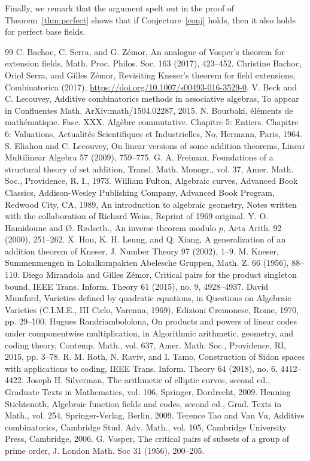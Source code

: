 \documentclass[10pt]{amsart}
\theoremstyle{definition}
\theoremstyle{remark}
\begin{document}
Finally, we remark that the argument spelt out in the proof of Theorem~\ref{thm:perfect} shows that if Conjecture~\ref{conj} holds, then it also holds for perfect base fields.
\begin{thebibliography}{99}
 C. Bachoc, C. Serra, and G. Zémor, An analogue of Vosper's theorem for extension fields, Math. Proc. Philos. Soc. 163 (2017), 423--452.
 Christine Bachoc, Oriol Serra, and Gilles Zémor, Revisiting Kneser's theorem for field extensions, Combinatorica (2017), \url{https://doi.org/10.1007/s00493-016-3529-0}.
 V. Beck and C. Lecouvey, Additive combinatorics methods in associative algebras, To appear in Confluentes Math. ArXiv:math/1504.02287, 2015.
 N. Bourbaki, éléments de mathématique. Fasc. XXX. Algèbre commutative. Chapitre 5: Entiers. Chapitre 6: Valuations, Actualités Scientifiques et Industrielles, No, Hermann, Paris, 1964.
 S. Eliahou and C. Lecouvey, On linear versions of some addition theorems, Linear Multilinear Algebra 57 (2009), 759--775.
 G. A. Freiman, Foundations of a structural theory of set addition, Transl. Math. Monogr., vol. 37, Amer. Math. Soc., Providence, R. I., 1973.
 William Fulton, Algebraic curves, Advanced Book Classics, Addison-Wesley Publishing Company, Advanced Book Program, Redwood City, CA, 1989, An introduction to algebraic geometry, Notes written with the collaboration of Richard Weiss, Reprint of 1969 original.
 Y. O. Hamidoune and Ø. Rødseth., An inverse theorem modulo $p$, Acta Arith. 92 (2000), 251--262.
 X. Hou, K. H. Leung, and Q. Xiang, A generalization of an addition theorem of Kneser, J. Number Theory 97 (2002), 1--9.
 M. Kneser, Summenmengen in Lokalkompakten Abelesche Gruppen, Math. Z. 66 (1956), 88--110.
 Diego Mirandola and Gilles Zémor, Critical pairs for the product singleton bound, IEEE Trans. Inform. Theory 61 (2015), no. 9, 4928--4937.
 David Mumford, Varieties defined by quadratic equations, in Questions on Algebraic Varieties (C.I.M.E., III Ciclo, Varenna, 1969), Edizioni Cremonese, Rome, 1970, pp. 29--100.
 Hugues Randriambololona, On products and powers of linear codes under componentwise multiplication, in Algorithmic arithmetic, geometry, and coding theory, Contemp. Math., vol. 637, Amer. Math. Soc., Providence, RI, 2015, pp. 3--78.
 R. M. Roth, N. Raviv, and I. Tamo, Construction of Sidon spaces with applications to coding, IEEE Trans. Inform. Theory 64 (2018), no. 6, 4412--4422.
 Joseph H. Silverman, The arithmetic of elliptic curves, second ed., Graduate Texts in Mathematics, vol. 106, Springer, Dordrecht, 2009.
 Henning Stichtenoth, Algebraic function fields and codes, second ed., Grad. Texts in Math., vol. 254, Springer-Verlag, Berlin, 2009.
 Terence Tao and Van Vu, Additive combinatorics, Cambridge Stud. Adv. Math., vol. 105, Cambridge University Press, Cambridge, 2006.
 G. Vosper, The critical pairs of subsets of a group of prime order, J. London Math. Soc 31 (1956), 200--205.
\end{thebibliography}
\end{document}
